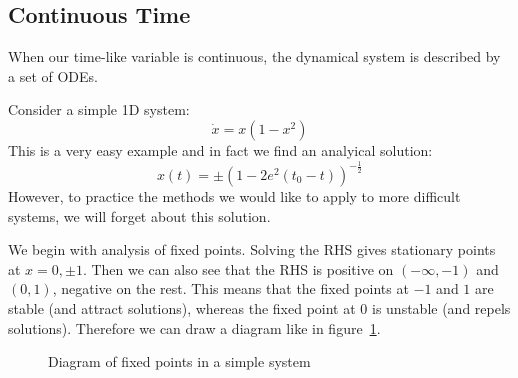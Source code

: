 \documentclass[../Main.tex]{subfiles}
\begin{document}
\subsection{Continuous Time}
When our time-like variable is continuous, the dynamical system is described by a set of ODEs.
\begin{example}
    Consider a simple 1D system:
    \begin{equation*}
        \dot{x} = x(1-x^2)
    \end{equation*}
    This is a very easy example and in fact we find an analyical solution:
    \begin{equation*}
        x(t) = \pm \left(1-2e^2(t_0 - t)\right)^{-\frac12}
    \end{equation*}
    However, to practice the methods we would like to apply to more difficult systems, we will forget about this solution.

    We begin with analysis of fixed points. Solving the RHS gives stationary points at $x = 0, \pm 1$. Then we can also see that the RHS is positive on $(-\infty, -1)$ and $(0, 1)$, negative on the rest. This means that the fixed points at $-1$ and $1$ are stable (and attract solutions), whereas the fixed point at $0$ is unstable (and repels solutions). Therefore we can draw a diagram like in figure~\ref{figSimpleSystem}.
\end{example}
\begin{figure}
    \label{figSimpleSystem}
    \caption{Diagram of fixed points in a simple system}
\end{figure}
\end{document}
